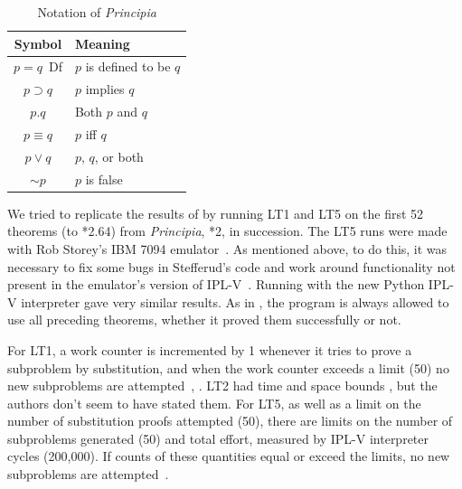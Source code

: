 \documentclass[journal]{IEEEtran}
\begin{document}
\begin{table}[h]
\centering
\caption{Notation of \textit{Principia}}
\label{tab:notation}
\begin{tabular}{cl}
\toprule
\textbf{Symbol} & \textbf{Meaning} \\
\midrule
$p=q$\ {\rm Df} & $p$ is defined to be $q$ \\
$p\supset q$ & $p$ implies $q$ \\
$p.q$ & Both $p$ and $q$ \\
$p\equiv q$ & $p$ iff $q$ \\
$p\vee q$ & $p$, $q$, or both \\
$\sim p$ & $p$ is false  \\
\bottomrule
\end{tabular}
\end{table}

We tried to replicate the results of \cite{LT1957}
by running LT1 and LT5 on the first 52 theorems (to *2.64)
from {\em Principia}, *2, in 
succession.  The LT5 runs were made with Rob Storey's
IBM 7094 emulator~\cite{ibsys}.  As mentioned above,
to do this, it was
necessary to fix some bugs in Stefferud's code and work 
around functionality not present in the emulator's version
of IPL-V~\cite{moewsrepo2}.  Running with the new Python
IPL-V interpreter gave very similar results.
As in \cite{LT1957}, 
the program is always allowed to use
all preceding theorems, whether it proved them successfully
or not.  

%
%
For LT1, a work counter is incremented by 1 whenever it tries
to prove a subproblem by substitution, and when the work counter
exceeds a limit (50) no new subproblems are 
attempted~\cite{moewsrepo}, \cite[p.~47]{LT1956b}.
LT2 had time and space bounds \cite[p.~223]{LT1957},
but the authors don't seem to have stated them.
%
%
For LT5, as well as a limit on the number of substitution proofs
attempted (50), there are limits on the number of subproblems
generated (50) and total effort, measured by IPL-V interpreter cycles (200,000).
If counts of these quantities equal or exceed the limits,
no new subproblems are attempted~\cite[pp.~154-155]{stefferud1963lt}.
\end{document}
